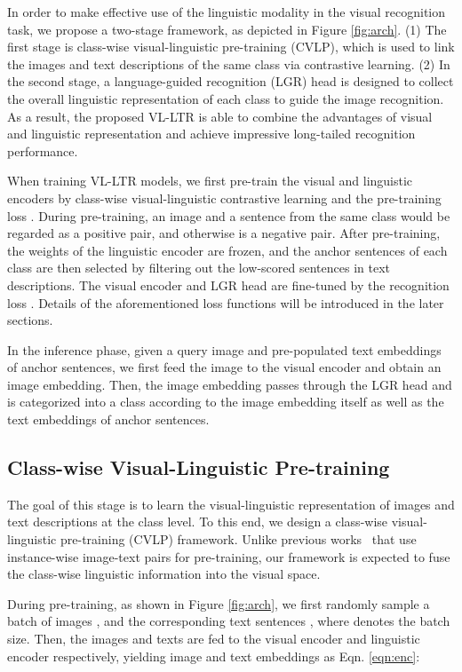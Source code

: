 \documentclass[runningheads]{llncs}
\begin{document}
In order to make effective use of the linguistic modality in the visual recognition task, we propose a two-stage framework, as depicted in Figure \ref{fig:arch}. 
(1) The first stage is class-wise visual-linguistic pre-training (CVLP), which is used to link the images and text descriptions of the same class via contrastive learning.
(2) In the second stage, a language-guided recognition (LGR) head is designed to collect the overall linguistic representation of each class to guide the image recognition.
As a result, the proposed VL-LTR is able to combine the advantages of visual and linguistic representation and achieve impressive long-tailed recognition performance.

When training VL-LTR models, 
we first pre-train the visual and linguistic encoders by class-wise visual-linguistic contrastive learning and the pre-training loss . 
During pre-training, an image and a sentence from the same class would be regarded as a positive pair, and otherwise is a negative pair.
After pre-training, the weights of the linguistic encoder are frozen, and the anchor sentences of each class are then selected by filtering out the low-scored sentences in text descriptions. 
The visual encoder and LGR head are fine-tuned by the recognition loss . 
Details of the aforementioned loss functions will be introduced in the later sections.

In the inference phase, given a query image and pre-populated text embeddings of anchor sentences, we first feed the image to the visual encoder and obtain an image embedding.
Then, the image embedding passes through the LGR head and is categorized into a class according to the image embedding itself as well as the text embeddings of anchor sentences. 

\subsection{Class-wise Visual-Linguistic Pre-training}

The goal of this stage is to learn the visual-linguistic representation of images and text descriptions at the class level.
To this end,
we design a class-wise visual-linguistic pre-training (CVLP) framework. Unlike previous works~\cite{clip,jia2021scaling} that use instance-wise image-text pairs for pre-training, 
our framework is expected to fuse the class-wise linguistic information into the visual space.

During pre-training, as shown in Figure \ref{fig:arch}, we first randomly sample a batch of images , and the corresponding text sentences , where  denotes the batch size.
Then, the images  and texts  are fed to the visual encoder  and linguistic encoder  respectively, yielding image and text embeddings as Eqn. \ref{eqn:enc}:
\end{document}
